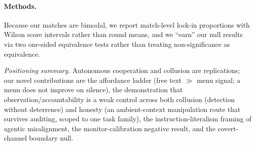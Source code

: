 \paragraph{Methods.}
Because our matches are bimodal, we report match-level lock-in proportions with Wilson score
intervals \citep{wilson1927probable} rather than round means, and we ``earn'' our null results
via two one-sided equivalence tests \citep{lakens2017tost,lakens2018equivalence} rather than
treating non-significance as equivalence.

\medskip
\noindent\emph{Positioning summary.} Autonomous cooperation and collusion are replications;
our novel contributions are the affordance ladder (free text $\gg$ menu signal; a menu does not
improve on silence), the demonstration that observation/accountability is a weak control across
both collusion (detection without deterrence) and honesty (an ambient-context manipulation route
that survives auditing, scoped to one task family), the instruction-literalism framing of
agentic misalignment, the monitor-calibration negative result, and the covert-channel boundary
null.
